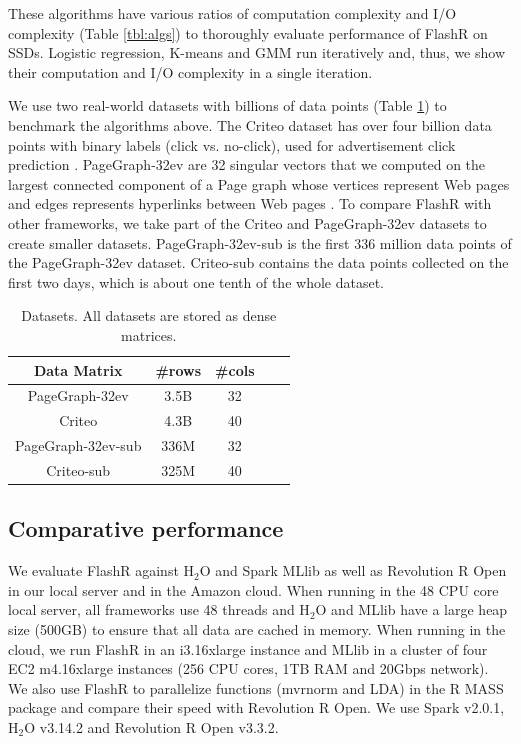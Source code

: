 These algorithms have various ratios of computation complexity and I/O complexity
(Table \ref{tbl:algs}) to thoroughly evaluate performance of FlashR on SSDs.
Logistic regression, K-means and GMM run iteratively and, thus, we show
their computation and I/O complexity in a single iteration.

We use two real-world datasets with billions of data points (Table \ref{tbl:data})
to benchmark the algorithms above. The Criteo dataset has over four billion data
points with binary labels (click vs. no-click), used for advertisement click
prediction \cite{criteo}. PageGraph-32ev are 32 singular vectors that we computed
on the largest connected component of a Page graph whose vertices represent Web
pages and edges represents hyperlinks between Web pages \cite{webgraph}.
To compare FlashR with other frameworks, we take part of the Criteo and
PageGraph-32ev datasets to
create smaller datasets. PageGraph-32ev-sub is the first 336 million data points
of the PageGraph-32ev dataset. Criteo-sub contains the data points collected
on the first two days, which is about one tenth of the whole dataset.

\begin{table}
\begin{center}
\caption{Datasets. All datasets are stored as dense matrices.}
\vspace{-10pt}
\footnotesize
\begin{tabular}{|c|c|c|c|c|}
\hline
Data Matrix & \#rows & \#cols \\
\hline
PageGraph-32ev \cite{webgraph} & 3.5B & 32 \\
\hline
Criteo \cite{criteo} & 4.3B & 40 \\
\hline
PageGraph-32ev-sub \cite{webgraph} & 336M & 32 \\
\hline
Criteo-sub \cite{criteo} & 325M & 40 \\
\hline
\end{tabular}
\normalsize
\label{tbl:data}
\end{center}
\vspace{-10pt}
\end{table}

\subsection{Comparative performance}
We evaluate FlashR against H$_2$O \cite{h2o} and Spark MLlib \cite{mllib} as well
as Revolution R Open \cite{rro} in our local server and in the Amazon
cloud. When running in the 48 CPU core local server, all frameworks
use 48 threads and H$_2$O and MLlib have a large heap size (500GB) to ensure that
all data are cached in memory. When running in the cloud, we run FlashR
in an i3.16xlarge instance
and MLlib in a cluster of four EC2 m4.16xlarge instances (256 CPU cores, 1TB RAM
and 20Gbps network). We also use FlashR to parallelize functions (mvrnorm and LDA)
in the R MASS package and compare their speed with Revolution R Open. We use
Spark v2.0.1, H$_2$O v3.14.2 and Revolution R Open v3.3.2.

